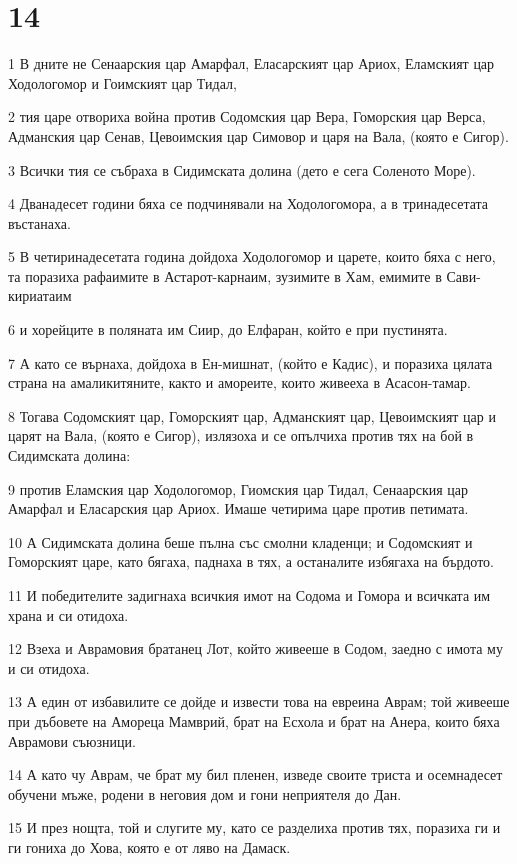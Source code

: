 \chapter{14}

\par 1 В дните не Сенаарския цар Амарфал, Еласарският цар Ариох, Еламският цар Ходологомор и Гоимският цар Тидал,
\par 2 тия царе отвориха война против Содомския цар Вера, Гоморския цар Верса, Адманския цар Сенав, Цевоимския цар Симовор и царя на Вала, (която е Сигор).
\par 3 Всички тия се събраха в Сидимската долина (дето е сега Соленото Море).
\par 4 Дванадесет години бяха се подчинявали на Ходологомора, а в тринадесетата въстанаха.
\par 5 В четиринадесетата година дойдоха Ходологомор и царете, които бяха с него, та поразиха рафаимите в Астарот-карнаим, зузимите в Хам, емимите в Сави-кириатаим
\par 6 и хорейците в поляната им Сиир, до Елфаран, който е при пустинята.
\par 7 А като се върнаха, дойдоха в Ен-мишнат, (който е Кадис), и поразиха цялата страна на амаликитяните, както и амореите, които живееха в Асасон-тамар.
\par 8 Тогава Содомският цар, Гоморският цар, Адманският цар, Цевоимският цар и царят на Вала, (която е Сигор), излязоха и се опълчиха против тях на бой в Сидимската долина:
\par 9 против Еламския цар Ходологомор, Гиомския цар Тидал, Сенаарския цар Амарфал и Еласарския цар Ариох. Имаше четирима царе против петимата.
\par 10 А Сидимската долина беше пълна със смолни кладенци; и Содомският и Гоморският царе, като бягаха, паднаха в тях, а останалите избягаха на бърдото.
\par 11 И победителите задигнаха всичкия имот на Содома и Гомора и всичката им храна и си отидоха.
\par 12 Взеха и Аврамовия братанец Лот, който живееше в Содом, заедно с имота му и си отидоха.
\par 13 А един от избавилите се дойде и извести това на евреина Аврам; той живееше при дъбовете на Амореца Мамврий, брат на Есхола и брат на Анера, които бяха Аврамови съюзници.
\par 14 А като чу Аврам, че брат му бил пленен, изведе своите триста и осемнадесет обучени мъже, родени в неговия дом и гони неприятеля до Дан.
\par 15 И през нощта, той и слугите му, като се разделиха против тях, поразиха ги и ги гониха до Хова, която е от ляво на Дамаск.
